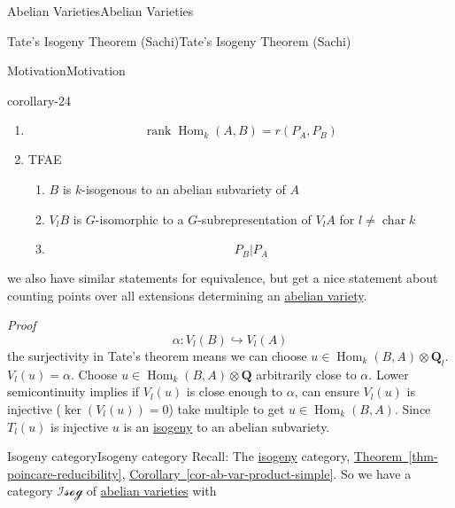 \documentclass[10pt,]{book}
\makeatletter
\renewcommand*{\proofname}{Proof}
\renewenvironment{proof}[1][\proofname]{\par
  \pushQED{\qed}%
  \normalfont \topsep6\p@\@plus6\p@\relax
  \trivlist
  \item\relax
    {\itshape
    #1\@addpunct{.}}\hspace\labelsep\ignorespaces
}{%
  \popQED\endtrivlist\@endpefalse
}
\numberwithin{equation}{section}
\newcommand{\QQ}{\mathbf{Q}}
\newcommand{\cat}[1]{\mathcal{#1}}
\DeclareMathOperator{\Hom}{Hom}
\DeclareMathOperator{\rank}{rank}
\DeclareMathOperator{\characteristic}{char}
\makeatother
\begin{document}
\begin{chapterptx}{Abelian Varieties}{}{Abelian Varieties}{}{}
\begin{sectionptx}{Tate's Isogeny Theorem (Sachi)}{}{Tate's Isogeny Theorem (Sachi)}{}{}
\begin{subsectionptx}{Motivation}{}{Motivation}{}{}
\begin{corollary}{}{}{corollary-24}
\begin{enumerate}
\item\hypertarget{li-66}{}%
\begin{equation*}
\rank \Hom_k(A,B) = r(P_A,P_B)
\end{equation*}
%
\item\hypertarget{li-67}{}\hypertarget{p-381}{}%
TFAE%
\begin{enumerate}
\item\hypertarget{li-68}{}\(B\) is \(k\)-isogenous to an abelian subvariety of \(A\)%
\item\hypertarget{li-69}{}\(V_lB\) is \(G\)-isomorphic to a \(G\)-subrepresentation of \(V_lA\) for \(l \ne \characteristic k\)%
\item\hypertarget{li-70}{}%
\begin{equation*}
P_B | P_A
\end{equation*}
%
\end{enumerate}
%
\end{enumerate}
we also have similar statements for equivalence, but get a nice statement about counting points over all extensions determining an \hyperref[def-buntes-abvar]{abelian variety}.%
\end{corollary}
\begin{proof}\hypertarget{proof-64}{}
\hypertarget{p-382}{}%
%
\begin{equation*}
\alpha \colon V_l(B)\hookrightarrow V_l(A)
\end{equation*}
the surjectivity in Tate's theorem means we can choose \(u \in \Hom_k(B,A) \otimes \QQ_l\). \(V_l(u) = \alpha\). Choose \(u \in \Hom_k(B,A) \otimes \QQ\) arbitrarily close to \(\alpha\). Lower semicontinuity implies if \(V_l(u)\) is close enough to \(\alpha\), can ensure \(V_l(u)\) is injective (\(\ker (V_l (u)) = 0\)) take multiple to get \(u \in \Hom_k(B,A)\). Since \(T_l (u)\) is injective \(u \) is an \hyperref[def-supersing-isog-isog]{isogeny} to an abelian subvariety.%
\end{proof}
\end{subsectionptx}
%
%
\typeout{************************************************}
\typeout{************************************************}
%
\begin{subsectionptx}{Isogeny category}{}{Isogeny category}{}{}\label{subsection-33}
\hypertarget{p-383}{}%
Recall: The \hyperref[def-supersing-isog-isog]{isogeny} category, \hyperref[thm-poincare-reducibility]{Theorem~\ref{thm-poincare-reducibility}}, \hyperref[cor-ab-var-product-simple]{Corollary~\ref{cor-ab-var-product-simple}}. So we have  a category \(\cat{Isog}\) of \hyperref[def-buntes-abvar]{abelian varieties} with%

\end{subsectionptx}
\end{sectionptx}
\end{chapterptx}
\end{document}

